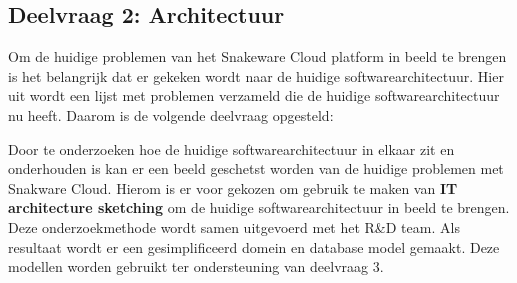 \subsection{Deelvraag 2: Architectuur}
Om de huidige problemen van het Snakeware Cloud platform in beeld te brengen is het belangrijk dat er gekeken wordt naar de huidige softwarearchitectuur.
Hier uit wordt een lijst met problemen verzameld die de huidige softwarearchitectuur nu heeft.
Daarom is de volgende deelvraag opgesteld:

\begin{center}
	\textit{\SubquestionTwo}
\end{center}

\whitespace[0.2]
Door te onderzoeken hoe de huidige softwarearchitectuur in elkaar zit en onderhouden is kan er een beeld geschetst worden van de huidige problemen met Snakware Cloud.
Hierom is er voor gekozen om gebruik te maken van \textbf{IT architecture sketching} om de huidige softwarearchitectuur in beeld te brengen.
Deze onderzoekmethode wordt samen uitgevoerd met het R\&D team.
Als resultaat wordt er een gesimplificeerd  domein en database model gemaakt.
Deze modellen worden gebruikt ter ondersteuning van deelvraag 3.
